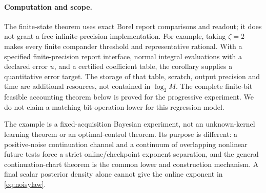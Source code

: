 \paragraph{Computation and scope.}
The finite-state theorem uses exact Borel report comparisons and readout; it does not grant a free infinite-precision implementation. For example, taking $\zeta=2$ makes every finite compander threshold and representative rational. With a specified finite-precision report interface, normal integral evaluations with a declared error $u$, and a certified coefficient table, the corollary supplies a quantitative error target. The storage of that table, scratch, output precision and time are additional resources, not contained in $\log_2 M$. The complete finite-bit feasible accounting theorem below is proved for the progressive experiment. We do not claim a matching bit-operation lower for this regression model.

The example is a fixed-acquisition Bayesian experiment, not an unknown-kernel learning theorem or an optimal-control theorem. Its purpose is different: a positive-noise continuation channel and a continuum of overlapping nonlinear future tests force a strict online/checkpoint exponent separation, and the general continuation-chart theorem is the common lower and construction mechanism. A final scalar posterior density alone cannot give the online exponent in \eqref{eq:noisylaw}.
